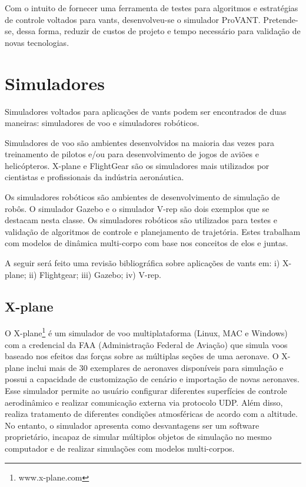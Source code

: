 Com o intuito de fornecer uma ferramenta de testes para algoritmos e estratégias de controle voltados para vants, desenvolveu-se o simulador ProVANT. Pretende-se, dessa forma, reduzir de custos de projeto e tempo necessário para validação de novas tecnologias.

\section{Simuladores}

Simuladores voltados para aplicações de vants podem ser encontrados de duas maneiras: simuladores de voo e simuladores robóticos.

Simuladores de voo são ambientes desenvolvidos na maioria das vezes para treinamento de pilotos e/ou para desenvolvimento de jogos de aviões e helicópteros. X-plane e FlightGear são os simuladores mais utilizados por cientistas e profissionais da indústria aeronáutica.

Os simuladores robóticos são ambientes de desenvolvimento de simulação de robôs. O simulador Gazebo e o simulador V-rep são dois exemplos que se destacam nesta classe. Os simuladores robóticos são utilizados para testes e validação de algoritmos de controle e planejamento de trajetória. Estes trabalham com modelos de dinâmica multi-corpo com base nos conceitos de elos e juntas. 

A seguir será feito uma revisão bibliográfica sobre aplicações de vants em: i) X-plane; ii) Flightgear; iii) Gazebo; iv) V-rep.


\subsection{X-plane}

O X-plane\footnote{www.x-plane.com} é um simulador de voo multiplataforma (Linux, MAC e Windows) com a credencial da FAA (Administração Federal de Aviação) que simula voos baseado nos efeitos das forças sobre as múltiplas seções de uma aeronave. O X-plane inclui mais de 30 exemplares de aeronaves disponíveis para simulação e possui a capacidade de customização de cenário e importação de novas aeronaves. Esse simulador permite ao usuário configurar diferentes superfícies de controle aerodinâmico e realizar comunicação externa via protocolo UDP. Além disso, realiza tratamento de diferentes condições atmosféricas de acordo com a altitude. No entanto, o simulador apresenta como desvantagens ser um software proprietário, incapaz de simular múltiplos objetos de simulação no mesmo computador e de realizar simulações com modelos multi-corpos.

